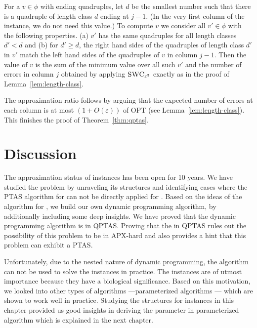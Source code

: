 For a $v \in \phi$ with ending quadruples,
let $d$ be the smallest number such that there is a quadruple of length class $d$ ending at $j-1$. (In the very first column of the instance, we do not need this value.)
To compute $v$ we consider all $v' \in \phi$ with the following properties.
(a) $v'$ has the same quadruples for all length classes $d' < d$ and 
(b) for $d' \ge d$, the right hand sides of the quadruples of length class $d'$ in $v'$ match the left hand sides of the quadruples of $v$ in column $j-1$.
Then the value of $v$ is the sum of the minimum value over all such $v'$ and the number of errors in column $j$ obtained by applying $\textsc{SWC}_{\varepsilon^3}$ exactly as in the proof of Lemma~\ref{lem:length-class}. 

The approximation ratio follows by arguing that the expected number of errors at each column is at most $(1+O(\varepsilon))$ of OPT
(see Lemma~\ref{lem:length-class}).
This finishes the proof of Theorem~\ref{thm:qptas}.

\section{Discussion}
The approximation status of \GMEC instances has been open for 10 years. 
We have studied the problem by unraveling its structures and identifying cases where the PTAS algorithm for \BMEC can not be directly applied for \GMEC.
Based on the ideas of the algorithm for \BMEC, we build our own dynamic programming algorithm, by additionally including some deep insights. 
We have proved that the dynamic programming algorithm is in QPTAS.
Proving that the \GMEC in QPTAS rules out the possibility of this problem to be in APX-hard and also provides a hint that this problem can exhibit a PTAS.

Unfortunately, due to the nested nature of dynamic programming, the algorithm can not be used to solve the \GMEC instances in practice.
The \GMEC instances are of utmost importance because they have a biological significance.
Based on this motivation, we looked into other types of algorithms ---parameterized algorithms \citep{martin2016whatshap} --- which are shown to work well in practice.
Studying the structures for \GMEC instances in this chapter provided us good insights in deriving the parameter in parameterized algorithm which is explained in the next chapter.